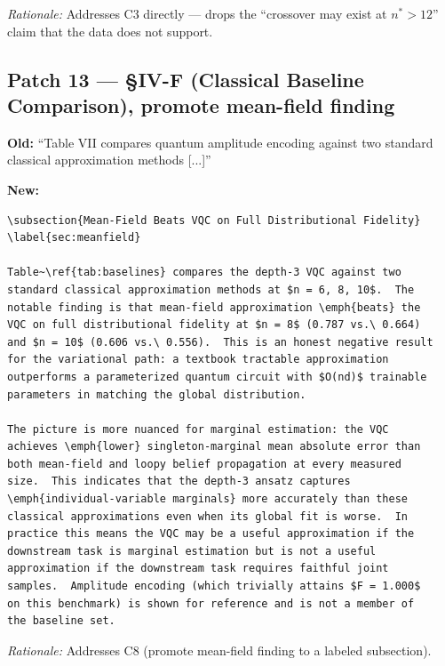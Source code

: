 \noindent\emph{Rationale:} Addresses C3 directly --- drops the ``crossover
may exist at $n^* > 12$'' claim that the data does not support.

\subsection*{Patch 13 --- \S IV-F (Classical Baseline Comparison), promote
mean-field finding}

\textbf{Old:} ``Table VII compares quantum amplitude encoding against two
standard classical approximation methods [...]''

\noindent\textbf{New:}

\begin{verbatim}
\subsection{Mean-Field Beats VQC on Full Distributional Fidelity}
\label{sec:meanfield}

Table~\ref{tab:baselines} compares the depth-3 VQC against two
standard classical approximation methods at $n = 6, 8, 10$.  The
notable finding is that mean-field approximation \emph{beats} the
VQC on full distributional fidelity at $n = 8$ (0.787 vs.\ 0.664)
and $n = 10$ (0.606 vs.\ 0.556).  This is an honest negative result
for the variational path: a textbook tractable approximation
outperforms a parameterized quantum circuit with $O(nd)$ trainable
parameters in matching the global distribution.

The picture is more nuanced for marginal estimation: the VQC
achieves \emph{lower} singleton-marginal mean absolute error than
both mean-field and loopy belief propagation at every measured
size.  This indicates that the depth-3 ansatz captures
\emph{individual-variable marginals} more accurately than these
classical approximations even when its global fit is worse.  In
practice this means the VQC may be a useful approximation if the
downstream task is marginal estimation but is not a useful
approximation if the downstream task requires faithful joint
samples.  Amplitude encoding (which trivially attains $F = 1.000$
on this benchmark) is shown for reference and is not a member of
the baseline set.
\end{verbatim}

\noindent\emph{Rationale:} Addresses C8 (promote mean-field finding to a
labeled subsection).

